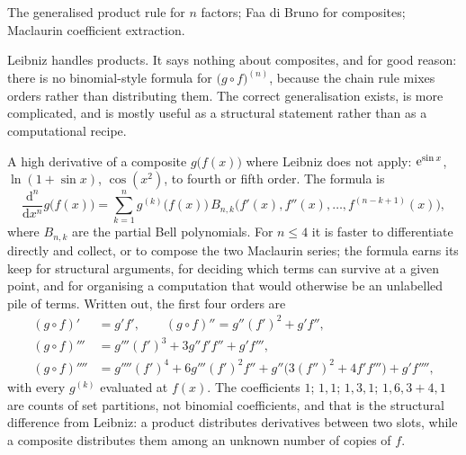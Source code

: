 \begin{seealsob}The generalised product rule for $n$ factors; Faa di Bruno for composites; Maclaurin coefficient extraction.\end{seealsob}

Leibniz handles products. It says nothing about composites, and for good reason: there is no binomial-style formula for $\bigl(g\circ f\bigr)^{(n)}$, because the chain rule mixes orders rather than distributing them. The correct generalisation exists, is more complicated, and is mostly useful as a structural statement rather than as a computational recipe.

\cue A high derivative of a composite $g\bigl(f(x)\bigr)$ where Leibniz does not apply: $\mathrm{e}^{\sin x}$, $\ln(1+\sin x)$, $\cos(x^{2})$, to fourth or fifth order.
\method The formula is
\[
\frac{\mathrm{d}^{n}}{\mathrm{d}x^{n}}g\bigl(f(x)\bigr)=\sum_{k=1}^{n}g^{(k)}\bigl(f(x)\bigr)\,B_{n,k}\bigl(f'(x),f''(x),\dots,f^{(n-k+1)}(x)\bigr),
\]
where $B_{n,k}$ are the partial Bell polynomials. For $n\leq4$ it is faster to differentiate directly and collect, or to compose the two Maclaurin series; the formula earns its keep for structural arguments, for deciding which terms can survive at a given point, and for organising a computation that would otherwise be an unlabelled pile of terms. Written out, the first four orders are
\begin{align*}
(g\circ f)' &= g'f', \qquad (g\circ f)'' = g''(f')^{2}+g'f'',\\
(g\circ f)''' &= g'''(f')^{3}+3g''f'f''+g'f''',\\
(g\circ f)'''' &= g''''(f')^{4}+6g'''(f')^{2}f''+g''\bigl(3(f'')^{2}+4f'f'''\bigr)+g'f'''',
\end{align*}
with every $g^{(k)}$ evaluated at $f(x)$. The coefficients $1$; $1,1$; $1,3,1$; $1,6,3{+}4,1$ are counts of set partitions, not binomial coefficients, and that is the structural difference from Leibniz: a product distributes derivatives between two slots, while a composite distributes them among an unknown number of copies of $f$.

